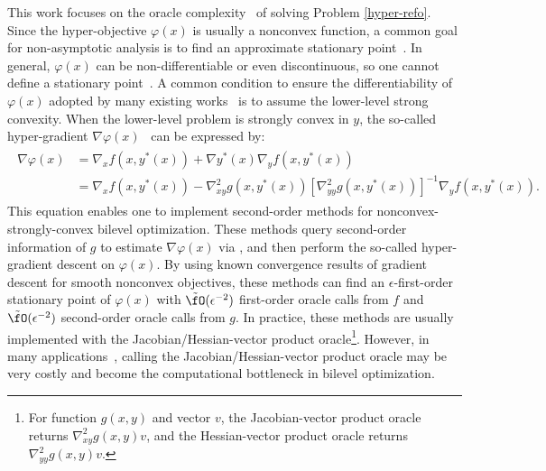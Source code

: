 \documentclass{article}
\begin{document}
This work focuses on the oracle complexity~\citep{nesterov2018lectures} of solving Problem \ref{hyper-refo}.
Since the hyper-objective $\varphi(x)$ is usually a nonconvex function, 
a common goal for non-asymptotic analysis is to find an approximate
stationary point~\citep{carmon2020lower,carmon2021lower,arjevani2023lower,fang2018spider,fang2019sharp}. In general, $\varphi(x)$ can be non-differentiable or even discontinuous, so one cannot define a stationary point~\citep{chen2023bilevel}.
A common condition to ensure the differentiability of $\varphi(x)$  adopted by many existing works~\citep{dagreou2022framework,ji2021bilevel,yang2021provably,ji2022will,ji2021lower,chen2021closing,khanduri2021near,hong2023two} 
is to assume the lower-level strong convexity.
When the lower-level problem is strongly convex in $y$,
the so-called hyper-gradient $\nabla \varphi(x)$~\citep{pedregosa2016hyperparameter,grazzi2020iteration} can be expressed by:
\begin{align} \label{hyper-grad} 
\begin{split}
    \nabla \varphi(x) 
    &= 
    \nabla_x f(x,y^*(x)) + \nabla y^*(x) \nabla_y f(x,y^*(x)) \\
    &=
    \nabla_x f(x,y^*(x)) - \nabla_{xy}^2 g(x,y^*(x)) [ \nabla_{yy}^2 g(x,y^*(x))]^{-1} \nabla_y f(x,y^*(x)).
\end{split}
\end{align}
This equation enables one to implement
second-order methods \citep{ji2021bilevel,ghadimi2018approximation} for nonconvex-strongly-convex bilevel optimization. 
These methods query 
second-order information of $g$ to 
estimate $\nabla \varphi(x)$ via , and then
perform the so-called hyper-gradient descent on $\varphi(x)$. 
By using known convergence results of gradient descent for smooth nonconvex objectives, these methods can find an $\epsilon$-first-order stationary point of $\varphi(x)$ with $\tilde \fO(\epsilon^{-2})$ first-order oracle calls from $f$ and $\tilde \fO(\epsilon^{-2})$ second-order oracle calls from $g$.  
In practice, these methods are usually implemented with the Jacobian/Hessian-vector product oracle\footnote{For function $g(x,y)$ and vector $v$, the Jacobian-vector product oracle returns $ \nabla_{xy}^2 g(x,y) v $, and the Hessian-vector product oracle returns $\nabla_{yy}^2 g(x,y)v$.}.
However, in many applications~\citep{sow2022convergence,song2019maml,finn2017model,nichol2018first}, calling the Jacobian/Hessian-vector product oracle may be very costly and become the computational bottleneck in bilevel optimization.
\end{document}
